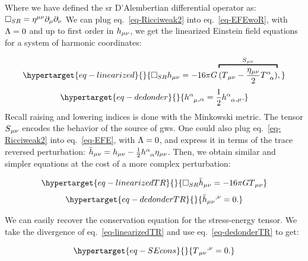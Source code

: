 \documentclass[
  11pt,
  a4paper,
  DIV=11,
  numbers=noendperiod,
  oneside]{scrreprt}
\DeclareRobustCommand{\[}{\begin{equation}}
\DeclareRobustCommand{\]}{\end{equation}}
\begin{document}
Where we have defined the \gls{sr} D'Alembertian differential operator
as: \(\SRDA=\invmink \partialder[\mu]\partialder[\nu]\) We can plug
eq.~\ref{eq-Ricciweak2} into eq.~\ref{eq-EFEwoR}, with \(\cosmo=0\) and
up to first order in \(\weakmet\), we get the linearized Einstein field
equations for a system of harmonic coordinates:

\begin{equation}\protect\hypertarget{eq-linearized}{}{
\square_{SR} \weakmet = -16\pi \grav \overbracket{(\SEco-\frac{\mink}{2}\trSE)}^{\srcco} ,
}\label{eq-linearized}\end{equation}
\begin{equation}\protect\hypertarget{eq-dedonder}{}{
\ipdv{\mixweakmet[\ind{\alpha}{\mu}]}{\alpha}=\frac{1}{2}\ipdv{\trweakmet}{\mu}. 
}\label{eq-dedonder}\end{equation} Recall raising and lowering indices
is done with the Minkowski metric. The tensor \(\srcco\) encodes the
behavior of the source of \glspl{gw}. One could also plug
eq.~\ref{eq-Ricciweak2} into eq.~\ref{eq-EFE}, with \(\cosmo=0\), and
express it in terms of the trace reversed perturbation:
\(\weakTRmet=\weakmet - \frac{1}{2}\trweakmet\mink\). Then, we obtain
similar and simpler equations at the cost of a more complex
perturbation: 

\begin{equation}\protect\hypertarget{eq-linearizedTR}{}{
\square_{SR} \weakTRmet = -16\pi \grav \SEco
}\label{eq-linearizedTR}\end{equation}
\begin{equation}\protect\hypertarget{eq-dedonderTR}{}{
    \ipdv[^]{\weakTRmet}{\nu}=0. 
}\label{eq-dedonderTR}\end{equation}

We can easily recover the conservation equation for the stress-energy
tensor. We take the divergence of eq.~\ref{eq-linearizedTR} and use
eq.~\ref{eq-dedonderTR} to get:

\begin{equation}\protect\hypertarget{eq-SEcons}{}{
    \ipdv[^]{\SEco}{\nu}=0.
}\label{eq-SEcons}\end{equation}
\end{document}
